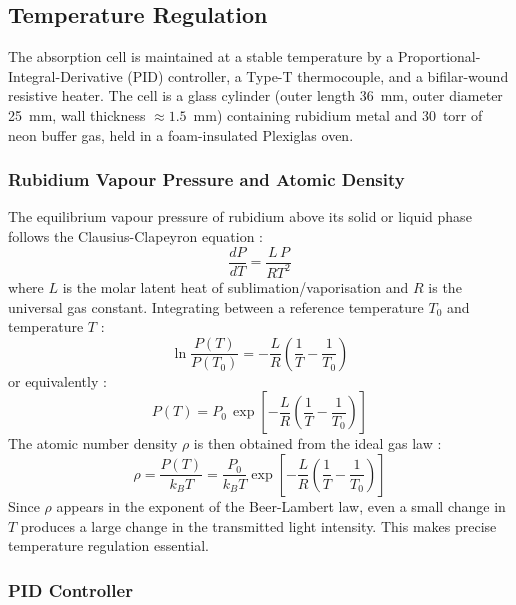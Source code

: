 \subsection{Temperature Regulation}

The absorption cell is maintained at a stable temperature by a
Proportional-Integral-Derivative (PID) controller, a Type-T thermocouple, and a
bifilar-wound resistive heater. The cell is a glass cylinder (outer length 36~mm,
outer diameter 25~mm, wall thickness $\approx 1.5$~mm) containing rubidium metal
and 30~torr of neon buffer gas, held in a foam-insulated Plexiglas oven.

\subsubsection*{Rubidium Vapour Pressure and Atomic Density}

The equilibrium vapour pressure of rubidium above its solid or liquid phase follows
the Clausius-Clapeyron equation :
\begin{equation}
    \frac{dP}{dT} = \frac{L\,P}{RT^2}
\end{equation}
where $L$ is the molar latent heat of sublimation/vaporisation and $R$ is the universal
gas constant. Integrating between a reference temperature $T_0$ and temperature $T$ :
\begin{equation}
    \ln\frac{P(T)}{P(T_0)} = -\frac{L}{R}\left(\frac{1}{T} - \frac{1}{T_0}\right)
\end{equation}
or equivalently :
\begin{equation}
    P(T) = P_0\,\exp\!\left[-\frac{L}{R}\left(\frac{1}{T} - \frac{1}{T_0}\right)\right]
\end{equation}
The atomic number density $\rho$ is then obtained from the ideal gas law :
\begin{equation}
    \rho = \frac{P(T)}{k_B T} = \frac{P_0}{k_B T}
    \exp\!\left[-\frac{L}{R}\left(\frac{1}{T} - \frac{1}{T_0}\right)\right]
\end{equation}
Since $\rho$ appears in the exponent of the Beer-Lambert law, even a small change in
$T$ produces a large change in the transmitted light intensity. This makes precise
temperature regulation essential.

\subsubsection*{PID Controller}

